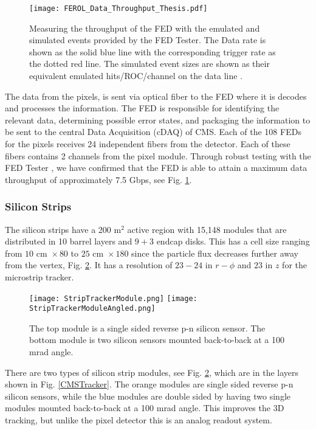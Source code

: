 \begin{figure}
 	\centering
	\texttt{[image: FEROL\_Data\_Throughput\_Thesis.pdf]}
 	\caption[FED Throughput]{Measuring the throughput of the FED with the emulated and simulated events provided by the FED Tester. The Data rate is shown as the solid blue line with the corresponding trigger rate as the dotted red line. The simulated event sizes are shown as their equivalent emulated hits/ROC/channel on the data line \cite{kilpatrick_fed_2018}.}
 	\label{FEDThroughput} 
\end{figure}

The data from the pixels, is sent via optical fiber to the FED where it is decodes and processes the information. The FED is responsible for identifying the relevant data, determining possible error states, and packaging the information to be sent to the central Data Acquisition (cDAQ) of CMS. Each of the 108 FEDs for the pixels receives 24 independent fibers from the detector. Each of these fibers contains 2 channels from the pixel module. Through robust testing with the FED Tester \cite{kilpatrick_fed_2018}, we have confirmed that the FED is able to attain a maximum data throughput of approximately 7.5 Gbps, see Fig. \ref{FEDThroughput}. 

\subsubsection{Silicon Strips}
\label{subsec:Strips}

The silicon strips have a 200 m$^2$ active region with 15,148 modules that are distributed in 10 barrel layers and $9+3$ endcap disks.
This has a cell size ranging from $10 \text{ cm } \times80$ \mum{} to $25 \text{ cm } \times 180$ \mum{} \cite{cms_collaboration_description_2014} since the particle flux decreases further away from the vertex, Fig. \ref{SiliconStrips}. It has a resolution of $23-24$ \mum{} in $r-\phi$ and $23$ \mum{} in $z$ for the microstrip tracker.

\begin{figure}[!htb]
	\centering
	\texttt{[image: StripTrackerModule.png]}
	\texttt{[image: StripTrackerModuleAngled.png]}
	\caption[Strip Tracker Module]{The top module is a single sided reverse p-n silicon sensor. The bottom module is two silicon sensors mounted back-to-back at a 100 mrad angle.}
 	\label{SiliconStrips} 
\end{figure}

There are two types of silicon strip modules, see Fig. \ref{SiliconStrips}, which are in the layers shown in Fig. \ref{CMSTracker}. The orange modules are single sided reverse p-n silicon sensors, while the blue modules are double sided by having two single modules mounted back-to-back at a 100 mrad angle. This improves the 3D tracking, but unlike the pixel detector this is an analog readout system. 

